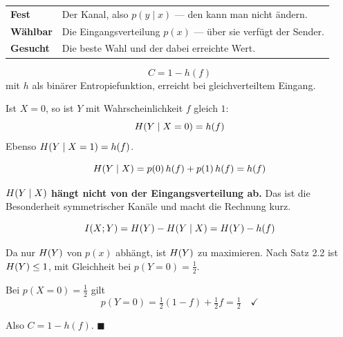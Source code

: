 \begin{merksatz}
\begin{center}
{\small
\renewcommand{\arraystretch}{1.52}
\begin{tabular}{@{}P{2.4cm}P{6.2cm}@{}}
\toprule
\textbf{Fest} & Der Kanal, also $p(y\mid x)$ --- den kann man nicht ändern.\\
\textbf{Wählbar} & Die Eingangsverteilung $p(x)$ --- über sie verfügt der Sender.\\
\textbf{Gesucht} & Die beste Wahl und der dabei erreichte Wert.\\
\bottomrule
\end{tabular}}
\end{center}

\begin{center}
\begin{minipage}{0.88\textwidth}
\end{minipage}
\end{center}
\end{merksatz}

\begin{merksatz}
\[ C = 1 - h(f) \]
mit $h$ als binärer Entropiefunktion, erreicht bei gleichverteiltem Eingang.

Ist $X=0$, so ist $Y$ mit Wahrscheinlichkeit $f$ gleich $1$:
\[ H(Y\mid X=0) = h(f) \]
Ebenso $H(Y\mid X=1) = h(f)$.

\[ H(Y\mid X) = p(0)\,h(f) + p(1)\,h(f) = h(f) \]

\begin{center}
\begin{minipage}{0.9\textwidth}
\textbf{$H(Y\mid X)$ hängt nicht von der Eingangsverteilung ab.} Das ist die Besonderheit symmetrischer Kanäle und macht die Rechnung kurz.
\end{minipage}
\end{center}

\[ I(X;Y) = H(Y) - H(Y\mid X) = H(Y) - h(f) \]

Da nur $H(Y)$ von $p(x)$ abhängt, ist $H(Y)$ zu maximieren. Nach Satz 2.2 ist $H(Y) \le 1$, mit Gleichheit bei $p(Y=0)=\frac12$.

Bei $p(X=0)=\frac12$ gilt
\[ p(Y=0) = \tfrac12(1-f) + \tfrac12 f = \tfrac12 \quad \checkmark \]

Also $C = 1-h(f)$. $\blacksquare$
\end{merksatz}

